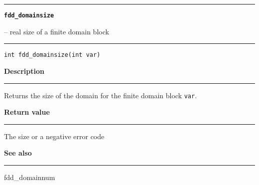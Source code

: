 \begin{minipage}{\textwidth}

\noindent\begin{minipage}{\textwidth}
\rule{\textwidth}{0.5mm}
{\tt\bf fdd\_domainsize }
\--- real size of a finite domain block  \hspace{\fill}
\\\rule[1.5ex]{\textwidth}{0.5mm}
\end{minipage}

\noindent\begin{verbatim}
int fdd_domainsize(int var) 
\end{verbatim}

\vspace{\parsep}\noindent
{\bf Description}\\\rule[1.5ex]{\textwidth}{0.2mm}\vspace{-1.5ex}\setlength{\parindent}{1em}
Returns the size of the domain for the finite domain
           block {\tt var}. 

\setlength{\parindent}{0em}\vspace{\parsep}\vspace{\baselineskip}\noindent
{\bf Return value}\\\rule[1.5ex]{\textwidth}{0.2mm}\vspace{-1.5ex}
The size or a negative error code 

\vspace{\parsep}\vspace{\baselineskip}\noindent
{\bf See also}\\\rule[1.5ex]{\textwidth}{0.2mm}\vspace{-1.5ex}
fdd\_domainnum 
\end{minipage}
\vspace{8ex}
